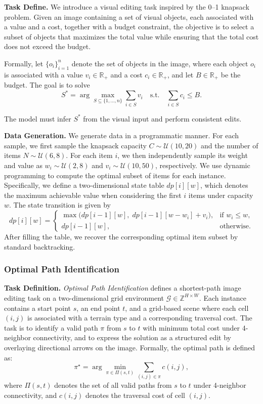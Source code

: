 \textbf{Task Define.} We introduce a visual editing task inspired by the 0--1 knapsack problem. Given
an image containing a set of visual objects, each associated with a value and
a cost, together with a budget constraint, the objective is to select a subset
of objects that maximizes the total value while ensuring that the total cost
does not exceed the budget.

Formally, let \(\{o_i\}_{i=1}^n\) denote the set of objects in the image,
where each object \(o_i\) is associated with a value \(v_i \in \mathbb{R}_+\)
and a cost \(c_i \in \mathbb{R}_+\), and let \(B \in \mathbb{R}_+\) be the
budget. The goal is to solve
\begin{equation}
S^* = \arg\max_{S \subseteq \{1,\dots,n\}} \sum_{i \in S} v_i
\quad \text{s.t.} \quad
\sum_{i \in S} c_i \le B.
\end{equation}

The model must infer \(S^*\) from the visual input and perform consistent edits.

\textbf{Data Generation.}
We generate data in a programmatic manner. For each sample, we first sample the
knapsack capacity \(C \sim \mathcal{U}(10,20)\) and the number of items
\(N \sim \mathcal{U}(6,8)\). For each item \(i\), we then independently sample
its weight and value as \(w_i \sim \mathcal{U}(2,8)\) and
\(v_i \sim \mathcal{U}(10,50)\), respectively. We use dynamic programming to compute the optimal subset of items for each
instance. Specifically, we define a two-dimensional state table \(dp[i][w]\),
which denotes the maximum achievable value when considering the first \(i\)
items under capacity \(w\). The state transition is given by
\begin{equation}
dp[i][w] =
\begin{cases}
\max\bigl(dp[i-1][w],\; dp[i-1][w-w_i] + v_i\bigr), & \text{if } w_i \le w,\\
dp[i-1][w], & \text{otherwise}.
\end{cases}
\end{equation}
After filling the table, we recover the corresponding optimal item subset by
standard backtracking.

\subsubsection{Optimal Path Identification}

\textbf{Task Definition.}
\textit{Optimal Path Identification} defines a shortest-path image editing task on a two-dimensional grid environment $\mathcal{G} \in \mathbb{Z}^{H \times W}$. Each instance contains a start point $s$, an end point $t$, and a grid-based scene where each cell $(i,j)$ is associated with a terrain type and a corresponding traversal cost. The task is to identify a valid path $\pi$ from $s$ to $t$ with minimum total cost under 4-neighbor connectivity, and to express the solution as a structured edit by overlaying directional arrows on the image. Formally, the optimal path is defined as:
\[
\pi^\star = \arg\min_{\pi \in \Pi(s,t)} \sum_{(i,j) \in \pi} c(i,j),
\]
where $\Pi(s,t)$ denotes the set of all valid paths from $s$ to $t$ under 4-neighbor connectivity, and $c(i,j)$ denotes the traversal cost of cell $(i,j)$.

